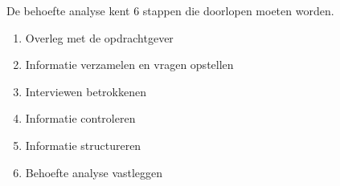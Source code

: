 De behoefte analyse kent 6 stappen die doorlopen moeten worden.
\begin{enumerate}
\item Overleg met de opdrachtgever
\item Informatie verzamelen en vragen opstellen
\item Interviewen betrokkenen
\item Informatie controleren
\item Informatie structureren
\item Behoefte analyse vastleggen
\end{enumerate}
